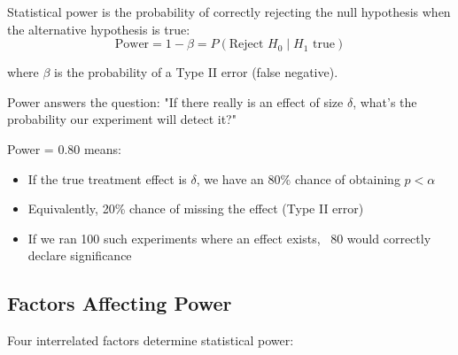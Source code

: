 \begin{definition}
Statistical power is the probability of correctly rejecting the null hypothesis when the alternative hypothesis is true:
\begin{equation}
\text{Power} = 1 - \beta = P(\text{Reject } H_0 \mid H_1 \text{ true})
\end{equation}

where $\beta$ is the probability of a Type II error (false negative).
\end{definition}

Power answers the question: "If there really is an effect of size $\delta$, what's the probability our experiment will detect it?"

\begin{example}
Power = 0.80 means:
\begin{itemize}
    \item If the true treatment effect is $\delta$, we have an 80\% chance of obtaining $p < \alpha$
    \item Equivalently, 20\% chance of missing the effect (Type II error)
    \item If we ran 100 such experiments where an effect exists, ~80 would correctly declare significance
\end{itemize}
\end{example}

\subsection{Factors Affecting Power}

Four interrelated factors determine statistical power:

